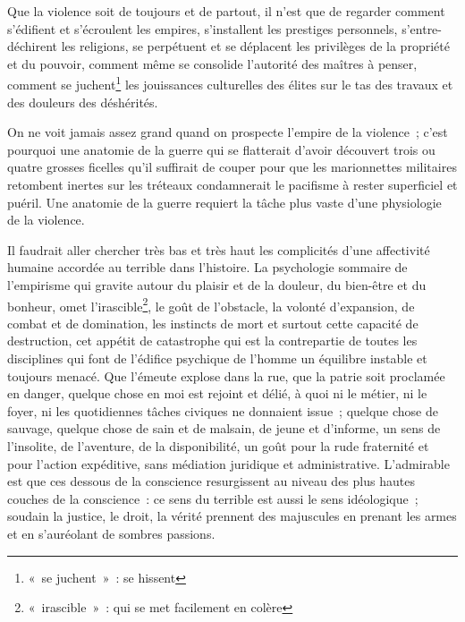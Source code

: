 {Que la violence soit de toujours et de partout, il n'est que de
regarder comment s'édifient et s'écroulent les empires, s'installent
les prestiges personnels, s'entre-déchirent les religions, se
perpétuent et se déplacent les privilèges de la propriété et du
pouvoir, comment même se consolide l'autorité des maîtres à penser,
comment se juchent\footnote{«~se juchent~»~: se hissent} les
jouissances culturelles des élites sur le tas des travaux et des
douleurs des déshérités.

On ne voit jamais assez grand quand on prospecte l'empire de la
violence~; c'est pourquoi une anatomie de la guerre qui se flatterait
d'avoir découvert trois ou quatre grosses ficelles qu'il suffirait de
couper pour que les marionnettes militaires retombent inertes sur les
tréteaux condamnerait le pacifisme à rester superficiel et puéril.
Une anatomie de la guerre requiert la tâche plus vaste d'une
physiologie de la violence.

Il faudrait aller chercher très bas et très haut les complicités d'une
affectivité humaine accordée au terrible dans l'histoire. La
psychologie sommaire de l'empirisme qui gravite autour du plaisir et
de la douleur, du bien-être et du bonheur, omet
l'irascible\footnote{«~irascible~»~: qui se met facilement en
colère}, le goût de l'obstacle, la volonté d'expansion, de combat et
de domination, les instincts de mort et surtout cette capacité de
destruction, cet appétit de catastrophe qui est la contrepartie de
toutes les disciplines qui font de l'édifice psychique de l'homme un
équilibre instable et toujours menacé. Que l'émeute explose dans la
rue, que la patrie soit proclamée en danger, quelque chose en moi est
rejoint et délié, à quoi ni le métier, ni le foyer, ni les
quotidiennes tâches civiques ne donnaient issue~; quelque chose de
sauvage, quelque chose de sain et de malsain, de jeune et d'informe,
un sens de l'insolite, de l'aventure, de la disponibilité, un goût
pour la rude fraternité et pour l'action expéditive, sans médiation
juridique et administrative. L'admirable est que ces dessous de la
conscience resurgissent au niveau des plus hautes couches de la
conscience~: ce sens du terrible est aussi le sens idéologique~;
soudain la justice, le droit, la vérité prennent des majuscules en
prenant les armes et en s'auréolant de sombres passions.
}

